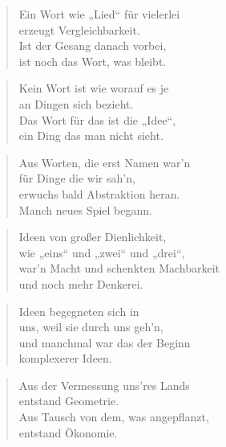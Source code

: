 \documentclass[10pt,a4paper]{article}
\begin{document}
\begin{multicols}{2}
\begin{verse}
Ein Wort wie „Lied“ für vielerlei \\
erzeugt Vergleichbarkeit. \\
Ist der Gesang danach vorbei, \\
ist noch das Wort, was bleibt. \\
\end{verse}

\begin{verse}
Kein Wort ist wie worauf es je \\
an Dingen sich bezieht. \\
Das Wort für das ist die „Idee“, \\
ein Ding das man nicht sieht. \\
\end{verse}

\begin{verse}
Aus Worten, die erst Namen war’n \\
für Dinge die wir sah’n, \\
erwuchs bald Abstraktion heran. \\
Manch neues Spiel begann. \\
\end{verse}

\begin{verse}
Ideen von großer Dienlichkeit, \\
wie „eins“ und „zwei“ und „drei“, \\
war’n Macht und schenkten Machbarkeit \\
und noch mehr Denkerei. \\
\end{verse}

\begin{verse}
Ideen begegneten sich in \\
uns, weil sie durch uns geh’n, \\
und manchmal war das der Beginn \\
komplexerer Ideen. \\
\end{verse}

\begin{verse}
Aus der Vermessung uns’res Lands \\
entstand Geometrie. \\
Aus Tausch von dem, was angepflanzt, \\
entstand Ökonomie. \\
\end{verse}


\end{multicols}
\end{document}
